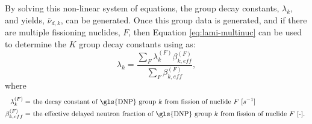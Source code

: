 By solving this non-linear system of equations, the group decay constants, $\lambda_k$, and yields, $\bar{\nu}_{d, k}$, can be generated.
Once this group data is generated, and if there are multiple fissioning nuclides, $F$, then Equation \eqref{eq:lami-multinuc} can be used to determine the $K$ group decay constants using \cite{das1993importance} as:
\begin{equation}
\lambda_k = \frac{\sum_{F} \lambda_k^{(F)} \beta_{k, eff}^{(F)}}{\sum_F \beta_{k, eff}^{(F)}},
\label{eq:lami-multinuc}
\end{equation}
where
\begin{align}
    \lambda_k^{(F)} =& \text{ the decay constant of \gls{DNP} group $k$ from fission of nuclide $F$ [$s^{-1}$]} \nonumber \\
    \beta_{k, eff}^{(F)} =& \text{ the effective delayed neutron fraction of \gls{DNP} group $k$ from fission of nuclide $F$ [-]. } \nonumber
\end{align}

